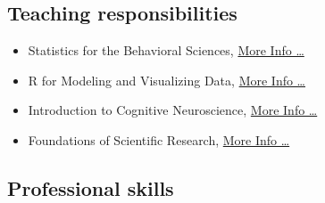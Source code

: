 \documentclass[10pt,]{article}
\begin{document}
\hypertarget{teaching-responsibilities}{%
\subsection{Teaching responsibilities}\label{teaching-responsibilities}}

\begin{itemize}
\item
  Statistics for the Behavioral Sciences,
  \href{https://likan.info/en/teach/Statistics-for-the-Behavioral-Sciences/}{More
  Info \ldots{}}
\item
  R for Modeling and Visualizing Data,
  \href{https://likan.info/en/teach/R-for-Statistics-Data-Visualization/}{More
  Info \ldots{}}
\item
  Introduction to Cognitive Neuroscience,
  \href{https://likan.info/en/teach/Introduction-to-Cognitive-Neuroscience/}{More
  Info \ldots{}}
\item
  Foundations of Scientific Research,
  \href{https://likan.info/en/teach/Science-and-Scientific-Research/}{More
  Info \ldots{}}
\end{itemize}

\hypertarget{professional-skills}{%
\subsection{Professional skills}\label{professional-skills}}
\end{document}

